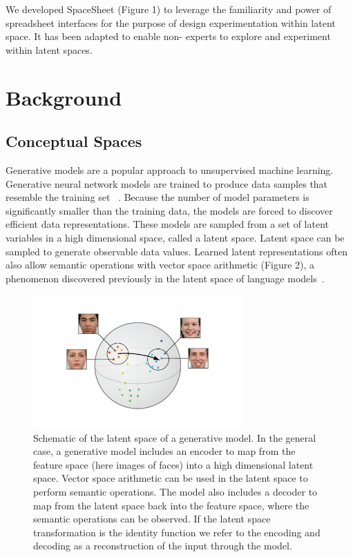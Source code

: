 \documentclass[letterpaper]{article}
\begin{document}
We developed SpaceSheet (Figure 1) to leverage the familiarity and power of spreadsheet interfaces for the purpose of design experimentation within latent space. It has been adapted to enable non- experts to explore and experiment within latent spaces.

\section{Background}

\subsection{Conceptual Spaces}

Generative models are a popular approach to unsupervised machine learning. Generative neural network models are trained to produce data samples that resemble the training set ~\cite{openai1}. Because the number of model parameters is significantly smaller than the training data, the models are forced to discover efficient data representations. These models are sampled from a set of latent variables in a high dimensional space, called a latent space. Latent space can be sampled to generate observable data values. Learned latent representations often also allow semantic operations with vector space arithmetic (Figure 2), a phenomenon discovered previously in the latent space of language models~\cite{word2vec}.

\begin{figure}[ht]
  \centering
  \includegraphics[width=8cm]{figs/face_space.png}
  \caption{Schematic of the latent space of a generative model. In the general case, a generative model includes an encoder to map from the feature space (here images of faces) into a high dimensional latent space. Vector space arithmetic can be used in the latent space to perform semantic operations. The model also includes a decoder to map from the latent space back into the feature space, where the semantic operations can be observed. If the latent space transformation is the identity function we refer to the encoding and decoding as a reconstruction of the input through the model. }
\end{figure}
\end{document}
